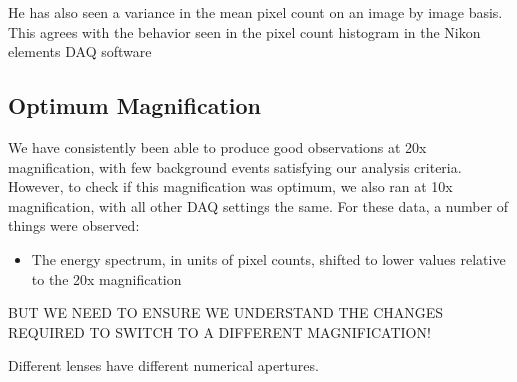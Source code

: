 \documentclass[11pt]{amsart}
\begin{document}
He has also seen a variance in the mean pixel count on an image by image basis. This agrees with the behavior seen in the pixel count histogram in the Nikon elements DAQ software

\subsection{Optimum Magnification}
We have consistently been able to produce good observations at 20x magnification, with few background events satisfying our analysis criteria. However, to check if this magnification was optimum, we also ran at 10x magnification, with all other DAQ settings the same. For these data, a number of things were observed:
\begin{itemize}
	\item The energy spectrum, in units of pixel counts, shifted to lower values relative to the 20x magnification
\end{itemize}
BUT WE NEED TO ENSURE WE UNDERSTAND THE CHANGES REQUIRED TO SWITCH TO A DIFFERENT MAGNIFICATION!

 Different lenses have different numerical apertures. 
 
 
 
 

\end{document}
